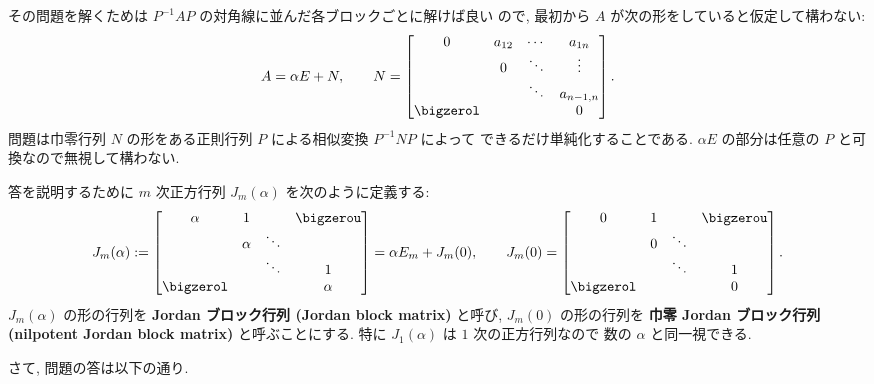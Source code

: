 \documentclass[12pt,twoside]{jarticle}
\begin{document}
その問題を解くためは $P^{-1}AP$ の対角線に並んだ各ブロックごとに解けば良い
ので, 最初から $A$ が次の形をしていると仮定して構わない:
\begin{equation*}
  A = \alpha E + N, \qquad
  N = 
  \begin{bmatrix}
    0 & a_{12} & \cdots & a_{1n} \\
      & 0      & \ddots & \vdots \\
      &        & \ddots & a_{n-1,n} \\
    \bigzerol & &       & 0 \\
  \end{bmatrix}.
\end{equation*}
問題は巾零行列 $N$ の形をある正則行列 $P$ による相似変換 $P^{-1}NP$ によって
できるだけ単純化することである.  
$\alpha E$ の部分は任意の $P$ と可換なので無視して構わない.

答を説明するために $m$ 次正方行列 $J_m(\alpha)$ を次のように定義する:
\begin{equation*}
  J_m(\alpha) := 
  \begin{bmatrix}
    \alpha    & 1      &        & \bigzerou \\
              & \alpha & \ddots & \\
              &        & \ddots & 1 \\
    \bigzerol &        &        & \alpha \\
  \end{bmatrix}
  = \alpha E_m + J_m(0),
  \qquad
  J_m(0) =
  \begin{bmatrix}
    0         & 1 &        & \bigzerou \\
              & 0 & \ddots & \\
              &   & \ddots & 1 \\
    \bigzerol &   &        & 0 \\
  \end{bmatrix}.
\end{equation*}
$J_m(\alpha)$ の形の行列を {\bf Jordan ブロック行列 (Jordan block matrix)} 
と呼び, $J_m(0)$ の形の行列を {\bf 巾零 Jordan ブロック行列 (nilpotent Jordan
block matrix)} と呼ぶことにする.  
特に $J_1(\alpha)$ は $1$ 次の正方行列なので
数の $\alpha$ と同一視できる.


さて, 問題の答は以下の通り.
\end{document}
